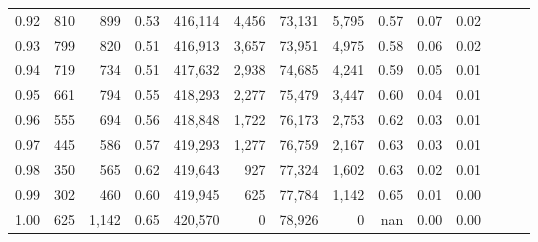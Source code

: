 \begin{tabular}{rrrrrrrrrrrrrr}
0.92 &    810 &    899 &  0.53 &  416,114 &    4,456 &  73,131 &   5,795 &  0.57 &  0.07 &      0.02 \\
0.93 &    799 &    820 &  0.51 &  416,913 &    3,657 &  73,951 &   4,975 &  0.58 &  0.06 &      0.02 \\
0.94 &    719 &    734 &  0.51 &  417,632 &    2,938 &  74,685 &   4,241 &  0.59 &  0.05 &      0.01 \\
0.95 &    661 &    794 &  0.55 &  418,293 &    2,277 &  75,479 &   3,447 &  0.60 &  0.04 &      0.01 \\
0.96 &    555 &    694 &  0.56 &  418,848 &    1,722 &  76,173 &   2,753 &  0.62 &  0.03 &      0.01 \\
0.97 &    445 &    586 &  0.57 &  419,293 &    1,277 &  76,759 &   2,167 &  0.63 &  0.03 &      0.01 \\
0.98 &    350 &    565 &  0.62 &  419,643 &      927 &  77,324 &   1,602 &  0.63 &  0.02 &      0.01 \\
0.99 &    302 &    460 &  0.60 &  419,945 &      625 &  77,784 &   1,142 &  0.65 &  0.01 &      0.00 \\
1.00 &    625 &  1,142 &  0.65 &  420,570 &        0 &  78,926 &       0 &   nan &  0.00 &      0.00 \\
\bottomrule
\end{tabular}
